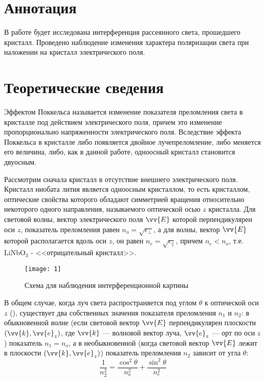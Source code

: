 \documentclass[a4paper, 12pt]{article}
\begin{document}

\section{Аннотация}
В работе будет исследована интерференция рассеянного света, прошедшего
кристалл. Проведено наблюдение изменения характера поляризации света
при наложении на кристалл электрического поля.






\section{Теоретические сведения}
Эффектом Поккельса называется изменение показателя преломления света в
кристалле под действием электрического поля, причем это изменение
пропорционально напряженности электрического поля. Вследствие эффекта
Поккельса в кристалле либо появляется двойное лучепреломление, либо
меняется его величина, либо, как в данной работе, одноосный кристалл
становится двуосным.

Рассмотрим сначала кристалл в отсутствие внешнего электрического поля.
Кристалл ниобата лития является одноосным кристаллом, то есть
кристаллом, оптические свойства которого обладают симметрией вращения
относительно некоторого одного направления, называемого оптической
осью $z$ кристалла. Для световой волны, вектор электрического поля
$\vv{E}$ которой перпендикулярен оси $z$, показатель преломления равен
$n_o = \sqrt{\epsilon_\perp}$, а для волны, вектор $\vv{E}$ которой
располагается вдоль оси $z$, он равен $n_e = \sqrt{\epsilon_\|}$,
причем $n_e<n_o$, т.е. LiNbO$_3$ - <<отрицательный кристалл>>.


\begin{figure}[H]
    \texttt{[image: 1]} 
    \caption{Схема для наблюдения интерференционной картины}
    \label{fig:1}
\end{figure}

В общем случае, когда луч света распространяется под углом $\theta$ к
оптической оси $z$ (), существует два собственных значения
показателя преломления $n_1$ и $n_2$: в обыкновенной волне (если
световой вектор $\vv{E}$ перпендикулярен плоскости
$(\vv{k},\vv{e}_z)$, где $\vv{k}$ --- волновой вектор луча, $\vv{e}_z$
--- орт по оси $z$) показатель $n_1 = n_o$, а в необыкновенной (когда
световой вектор $\vv{E}$ лежит в плоскости $(\vv{k},\vv{e}_z)$)
показатель преломления $n_2$ зависит от угла $\theta$:
\begin{equation}
    \frac{1}{n_2^2} = \frac{\cos^2 \theta}{n_o^2} + \frac{\sin^2
    \theta}{n_e^2}
    \label{eq:1}
\end{equation}
\end{document}
